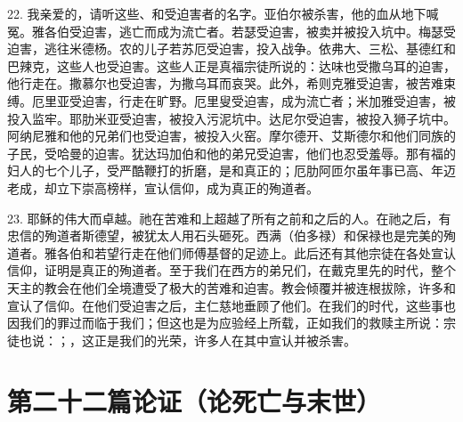 22. 我亲爱的，请听这些、和受迫害者的名字。亚伯尔被杀害，他的血从地下喊冤。雅各伯受迫害，逃亡而成为流亡者。若瑟受迫害，被卖并被投入坑中。梅瑟受迫害，逃往米德杨。农的儿子若苏厄受迫害，投入战争。依弗大、三松、基德红和巴辣克，这些人也受迫害。这些人正是真福宗徒所说的：达味也受撒乌耳的迫害，他行走在。撒慕尔也受迫害，为撒乌耳而哀哭。此外，希则克雅受迫害，被苦难束缚。厄里亚受迫害，行走在旷野。厄里叟受迫害，成为流亡者；米加雅受迫害，被投入监牢。耶肋米亚受迫害，被投入污泥坑中。达尼尔受迫害，被投入狮子坑中。阿纳尼雅和他的兄弟们也受迫害，被投入火窑。摩尔德开、艾斯德尔和他们同族的子民，受哈曼的迫害。犹达玛加伯和他的弟兄受迫害，他们也忍受羞辱。那有福的妇人的七个儿子，受严酷鞭打的折磨，是和真正的；厄肋阿匝尔虽年事已高、年迈老成，却立下崇高榜样，宣认信仰，成为真正的殉道者。\par

23. 耶稣的伟大而卓越。祂在苦难和上超越了所有之前和之后的人。在祂之后，有忠信的殉道者斯德望，被犹太人用石头砸死。西满（伯多禄）和保禄也是完美的殉道者。雅各伯和若望行走在他们师傅基督的足迹上。此后还有其他宗徒在各处宣认信仰，证明是真正的殉道者。至于我们在西方的弟兄们，在戴克里先的时代，整个天主的教会在他们全境遭受了极大的苦难和迫害。教会倾覆并被连根拔除，许多和宣认了信仰。在他们受迫害之后，主仁慈地垂顾了他们。在我们的时代，这些事也因我们的罪过而临于我们；但这也是为应验经上所载，正如我们的救赎主所说：宗徒也说：；，这正是我们的光荣，许多人在其中宣认并被杀害。\par



\section{第二十二篇论证（论死亡与末世）}

